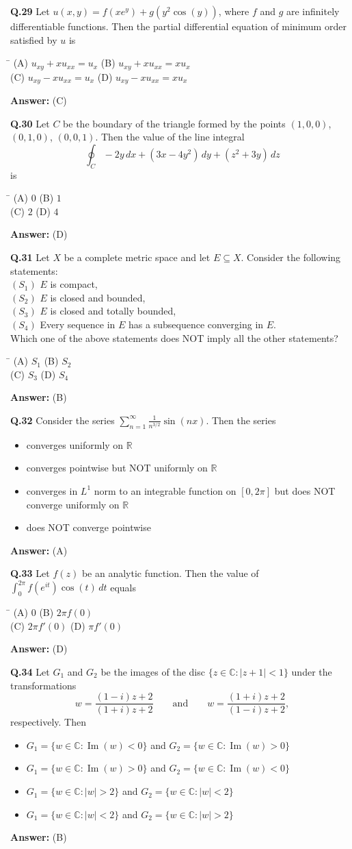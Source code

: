 \documentclass[11pt,a4paper]{article}
\newcommand{\optsfourA}[4]{%
  \begin{tabbing}
    \hspace{0.48\linewidth}\=\kill
    (A) #1 \> (B) #2 \\[2pt]
    (C) #3 \> (D) #4
  \end{tabbing}%
}
\newcommand{\optslistA}[4]{%
  \begin{itemize}
    \setlength{\itemsep}{2pt}\setlength{\parskip}{0pt}
    \item[(A)] #1
    \item[(B)] #2
    \item[(C)] #3
    \item[(D)] #4
  \end{itemize}%
}
\newcommand{\ans}[1]{\textbf{Answer:} #1\par\medskip}
\begin{document}
\textbf{Q.29} Let $u(x,y) = f(x e^y) + g(y^2 \cos(y))$, where $f$ and $g$ are infinitely differentiable functions. Then the partial differential equation of minimum order satisfied by $u$ is
\optsfourA{$u_{xy} + x u_{xx} = u_x$}{$u_{xy} + x u_{xx} = x u_x$}{$u_{xy} - x u_{xx} = u_x$}{$u_{xy} - x u_{xx} = x u_x$}
\ans{(C)}

\textbf{Q.30} Let $C$ be the boundary of the triangle formed by the points $(1,0,0)$, $(0,1,0)$, $(0,0,1)$. Then the value of the line integral
\[
  \oint_C -2y\,dx + (3x - 4y^2)\,dy + (z^2 + 3y)\,dz
\]
is
\optsfourA{$0$}{$1$}{$2$}{$4$}
\ans{(D)}

\textbf{Q.31} Let $X$ be a complete metric space and let $E \subseteq X$. Consider the following statements:\\
$(S_1)$ $E$ is compact,\\
$(S_2)$ $E$ is closed and bounded,\\
$(S_3)$ $E$ is closed and totally bounded,\\
$(S_4)$ Every sequence in $E$ has a subsequence converging in $E$.\\
Which one of the above statements does NOT imply all the other statements?
\optsfourA{$S_1$}{$S_2$}{$S_3$}{$S_4$}
\ans{(B)}

\textbf{Q.32} Consider the series $\displaystyle\sum_{n=1}^{\infty} \frac{1}{n^{3/2}}\sin(nx)$. Then the series
\optslistA{converges uniformly on $\mathbb{R}$}{converges pointwise but NOT uniformly on $\mathbb{R}$}{converges in $L^1$ norm to an integrable function on $[0, 2\pi]$ but does NOT converge uniformly on $\mathbb{R}$}{does NOT converge pointwise}
\ans{(A)}

\textbf{Q.33} Let $f(z)$ be an analytic function. Then the value of $\displaystyle\int_0^{2\pi} f(e^{it})\cos(t)\,dt$ equals
\optsfourA{$0$}{$2\pi f(0)$}{$2\pi f'(0)$}{$\pi f'(0)$}
\ans{(D)}

\textbf{Q.34} Let $G_1$ and $G_2$ be the images of the disc $\{z \in \mathbb{C} : |z + 1| < 1\}$ under the transformations
\[
  w = \frac{(1 - i)z + 2}{(1 + i)z + 2} \qquad \text{and} \qquad w = \frac{(1 + i)z + 2}{(1 - i)z + 2},
\]
respectively. Then
\optslistA{$G_1 = \{w \in \mathbb{C} : \operatorname{Im}(w) < 0\}$ and $G_2 = \{w \in \mathbb{C} : \operatorname{Im}(w) > 0\}$}{$G_1 = \{w \in \mathbb{C} : \operatorname{Im}(w) > 0\}$ and $G_2 = \{w \in \mathbb{C} : \operatorname{Im}(w) < 0\}$}{$G_1 = \{w \in \mathbb{C} : |w| > 2\}$ and $G_2 = \{w \in \mathbb{C} : |w| < 2\}$}{$G_1 = \{w \in \mathbb{C} : |w| < 2\}$ and $G_2 = \{w \in \mathbb{C} : |w| > 2\}$}
\ans{(B)}
\end{document}
